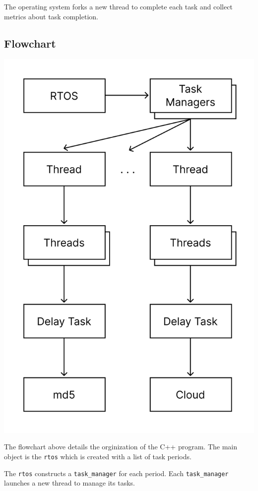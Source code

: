 \documentclass[twoside,twocolumn]{article}
\begin{document}
The operating system forks a new thread to complete each task and collect metrics about task completion.
   
\subsection{Flowchart}

\begin{center}
  \includegraphics[scale=0.75]{flowchart.png}
\end{center}

The flowchart above details the orginization of the C++ program.
The main object is the \texttt{rtos} which is created with a list of task periods.

The \texttt{rtos} constructs a \texttt{task\_manager} for each period.
Each \texttt{task\_manager} launches a new thread to manage its tasks.
\end{document}
